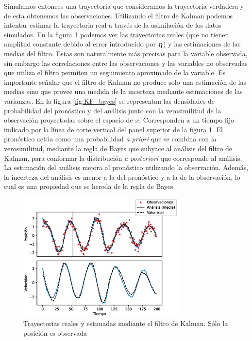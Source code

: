 Simulamos entonces una trayectoria que consideramos la trayectoria verdadera y de esta obtenemos las observaciones. Utilizando el filtro de Kalman podemos intentar estimar la trayectoria real a través de la asimilación de los datos simulados. En la figura \ref{fig:KF_harmonic_oscillator} podemos ver las trayectorias reales (que no tienen amplitud constante debido al error introducido por $\mbox{\boldmath$ \eta $}$) y las estimaciones de las medias del filtro. Estas son naturalmente más precisas para la variable observada, sin embargo las correlaciones entre las observaciones y las variables no observadas que utiliza el filtro permiten un seguimiento aproximado de la variable. Es importante señalar que el filtro de Kalman no produce solo una estimación de las medias sino que provee una medida de la incerteza mediante estimaciones de las varianzas. En la figura \ref{fig:KF_bayes} se representan las densidades de probabilidad del pronóstico y del análisis junto con la verosimilitud de la observación proyectadas sobre el espacio de $x$. Corresponden a un tiempo fijo indicado por la línea de corte vertical del panel superior de la figura \ref{fig:KF_harmonic_oscillator}. El pronóstico actúa como una probabilidad \textit{a priori} que se combina con la verosimilitud, mediante la regla de Bayes que subyace al análisis del filtro de Kalman, para conformar la distribución \textit{a posteriori} que corresponde al análisis. La estimación del análisis mejora al pronóstico utilizando la observación. Además, la incerteza del análisis es menor a la del pronóstico y a la de la observación, lo cual es una propiedad que se hereda de la regla de Bayes.

\begin{figure}[h!]
    \centering
    \includegraphics[width=0.75\textwidth]{example_codes/KF_harmonic_oscillator.eps}
    \caption{Trayectorias reales y estimadas mediante el filtro de Kalman. Sólo la posición es observada}
    \label{fig:KF_harmonic_oscillator}
\end{figure}

